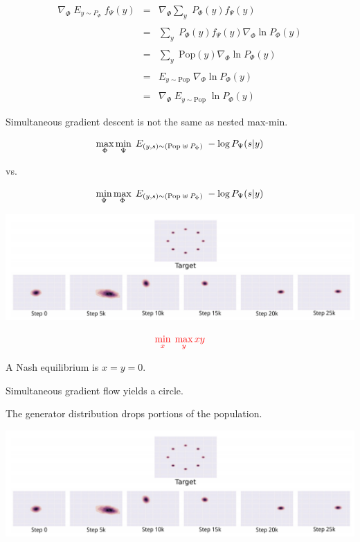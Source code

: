 {

\begin{eqnarray*}
 \nabla_\Phi \; E_{y \sim P_\Phi}\;  f_\Psi(y)  & = & \nabla _\Phi \sum_y\; P_\Phi(y) f_\Psi(y) \\
  \\
  & = & \sum_y \; P_\Phi(y) f_\Psi(y) \nabla_\Phi \ln P_\Phi(y) \\
  \\
  & = & \sum_y \;\mathrm{Pop}(y) \nabla_\Phi \ln P_\Phi(y) \\
  \\
  & = & E_{y \sim \mathrm{Pop}} \; \nabla_\Phi \ln P_\Phi(y) \\
  \\
  & = & \nabla_\Phi \; E_{y \sim \mathrm{Pop}} \;\ln P_\Phi(y)
\end{eqnarray*}


Simultaneous gradient descent is not the same as nested max-min.

\vfill
$$\max_\Phi \min_\Psi \;E_{(y,s) \sim (\mathrm{Pop}\; \uplus \;P_\Phi)}\;- \log P_\Psi(s|y)$$

\vfill
vs.

\vfill
$$\min_\Psi \max_\Phi \;E_{(y,s) \sim (\mathrm{Pop}\; \uplus \;P_\Phi)}\;- \log P_\Psi(s|y)$$


\centerline{\includegraphics[width=9in]{../images/Unstable1}}


$${\color{red} \min_x \; \max_y xy}$$

\vfill
A Nash equilibrium is $x= y = 0$.

\vfill
Simultaneous gradient flow yields a circle.


The generator distribution drops portions of the population.

\centerline{\includegraphics[width=9in]{../images/Unstable1}}

}
